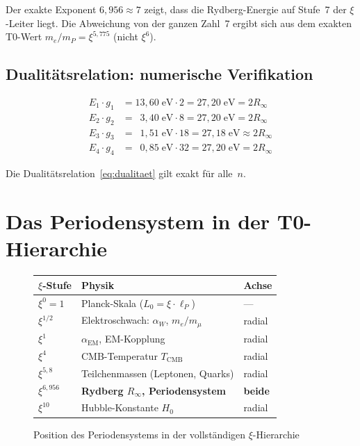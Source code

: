 Der exakte Exponent $6{,}956 \approx 7$ zeigt, dass die Rydberg-Energie
auf Stufe~7 der $\xi$-Leiter liegt. Die Abweichung von der ganzen Zahl~7
ergibt sich aus dem exakten T0-Wert $m_e/m_P = \xi^{5{,}775}$ (nicht $\xi^6$).

\subsection{Dualitätsrelation: numerische Verifikation}

\begin{align}
  E_1 \cdot g_1 &= 13{,}60\;\text{eV} \cdot 2  = 27{,}20\;\text{eV} = 2R_\infty \\
  E_2 \cdot g_2 &= \phantom{0}3{,}40\;\text{eV} \cdot 8  = 27{,}20\;\text{eV} = 2R_\infty \\
  E_3 \cdot g_3 &= \phantom{0}1{,}51\;\text{eV} \cdot 18 = 27{,}18\;\text{eV} \approx 2R_\infty \\
  E_4 \cdot g_4 &= \phantom{0}0{,}85\;\text{eV} \cdot 32 = 27{,}20\;\text{eV} = 2R_\infty
\end{align}

Die Dualitätsrelation~\eqref{eq:dualitaet} gilt exakt für alle~$n$.

\section{Das Periodensystem in der T0-Hierarchie}
\label{sec:hierarchie}

\begin{figure}[htbp]
\centering
\begin{tabular}{|l|l|l|}
\hline
\textbf{$\xi$-Stufe} & \textbf{Physik} & \textbf{Achse} \\
\hline
$\xi^0 = 1$      & Planck-Skala ($L_0 = \xi \cdot \ell_P$) & — \\
$\xi^{1/2}$      & Elektroschwach: $\alpha_W$, $m_e/m_\mu$  & radial \\
$\xi^1$          & $\alpha_\text{EM}$, EM-Kopplung           & radial \\
$\xi^4$          & CMB-Temperatur $T_\text{CMB}$             & radial \\
$\xi^{5{,}8}$    & Teilchenmassen (Leptonen, Quarks)         & radial \\
$\xi^{6{,}956}$  & \textbf{Rydberg $R_\infty$, Periodensystem} & \textbf{beide} \\
$\xi^{10}$       & Hubble-Konstante $H_0$                    & radial \\
\hline
\end{tabular}
\caption{Position des Periodensystems in der vollständigen $\xi$-Hierarchie}
\label{fig:hierarchie}
\end{figure}

